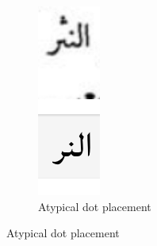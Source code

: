 \begin{figure}[h]
	\begin{subfigure}[b]{0.3\linewidth}
	\centering
	\includegraphics[width=\linewidth]{images/image26.png}
	\caption{Atypical dot placement}
	\label{fig:fig12}
	\end{subfigure}


\end{figure}
